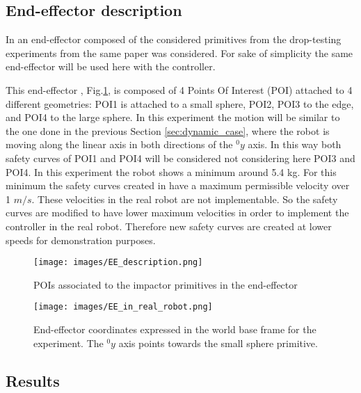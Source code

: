 \subsection{End-effector description}
In \cite{sammi_paper} an end-effector composed of the
considered primitives from the drop-testing experiments from the same paper was considered. For sake of simplicity the same end-effector will be used here with the controller.

This end-effector , Fig.\ref{fig:EE_description}, is composed of 4 Points Of Interest (POI) attached to 4 different geometries: POI1 is attached to a small sphere, POI2, POI3 to the edge, and POI4 to the large sphere. 
In this experiment the motion will be similar to the one done in the previous Section \ref{sec:dynamic_case}, where the robot is moving along the linear axis in both directions of the ${}^{0}_{}y$ axis. In this way both safety curves of POI1 and POI4 will be considered not considering here POI3 and POI4.
In this experiment the robot shows a minimum around 5.4 kg. For this minimum the safety curves created in  \cite{sammi_paper} have a maximum permissible velocity over 1 $m/s$. These velocities in the real robot are not implementable. So the safety curves are modified to have lower maximum velocities in order to implement the controller in the real robot. Therefore new safety curves are created at lower speeds for demonstration purposes.





\begin{figure}[htb]
	\centerline{
		\texttt{[image: images/EE\_description.png]}}
	\caption{POIs associated to the impactor primitives in the end-effector \cite{sammi_paper}}
	\label{fig:EE_description}
\end{figure}



\begin{figure}[htb]
	\centerline{
		\texttt{[image: images/EE\_in\_real\_robot.png]}}
	\caption{End-effector coordinates expressed in the world base frame for the experiment. The ${}^{0}_{}y$ axis points towards the small sphere primitive. \cite{sammi_paper}}
	\label{fig:EE_in_real_robot}
\end{figure}





\subsection{Results}

